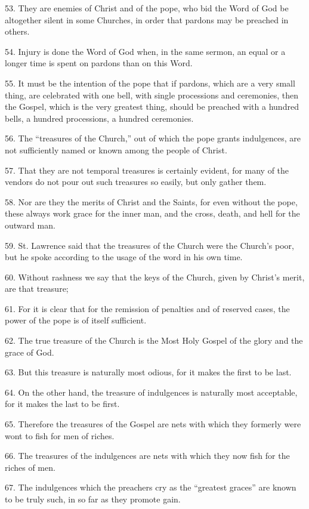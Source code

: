 53. They are enemies of Christ and of the pope, who bid the Word of God
be altogether silent in some Churches, in order that pardons may be
preached in others.

54. Injury is done the Word of God when, in the same sermon, an equal
or a longer time is spent on pardons than on this Word.

55. It must be the intention of the pope that if pardons, which are a
very small thing, are celebrated with one bell, with single processions
and ceremonies, then the Gospel, which is the very greatest thing,
should be preached with a hundred bells, a hundred processions, a
hundred ceremonies.

56. The ``treasures of the Church,'' out of which the pope grants
indulgences, are not sufficiently named or known among the people of
Christ.

57. That they are not temporal treasures is certainly evident, for many
of the vendors do not pour out such treasures so easily, but only
gather them.

58. Nor are they the merits of Christ and the Saints, for even without
the pope, these always work grace for the inner man, and the cross,
death, and hell for the outward man.

59. St. Lawrence said that the treasures of the Church were the
Church's poor, but he spoke according to the usage of the word in his
own time.

60. Without rashness we say that the keys of the Church, given by
Christ's merit, are that treasure;

61. For it is clear that for the remission of penalties and of reserved
cases, the power of the pope is of itself sufficient.

62. The true treasure of the Church is the Most Holy Gospel of the
glory and the grace of God.

63. But this treasure is naturally most odious, for it makes the first
to be last.

64. On the other hand, the treasure of indulgences is naturally most
acceptable, for it makes the last to be first.

65. Therefore the treasures of the Gospel are nets with which they
formerly were wont to fish for men of riches.

66. The treasures of the indulgences are nets with which they now fish
for the riches of men.

67. The indulgences which the preachers cry as the ``greatest graces''
are known to be truly such, in so far as they promote gain.

